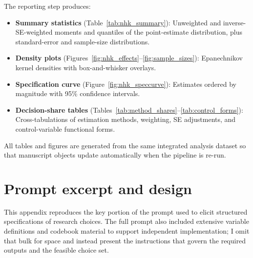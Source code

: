 \documentclass[12pt]{article}
\begin{document}
The reporting step produces:
\begin{itemize}
\item \textbf{Summary statistics} (Table~\ref{tab:nhk_summary}): Unweighted and inverse-SE-weighted moments and quantiles of the point-estimate distribution, plus standard-error and sample-size distributions.
\item \textbf{Density plots} (Figures~\ref{fig:nhk_effects}--\ref{fig:sample_sizes}): Epanechnikov kernel densities with box-and-whisker overlays.
\item \textbf{Specification curve} (Figure~\ref{fig:nhk_speccurve}): Estimates ordered by magnitude with 95\% confidence intervals.
\item \textbf{Decision-share tables} (Tables~\ref{tab:method_shares}--\ref{tab:control_forms}): Cross-tabulations of estimation methods, weighting, SE adjustments, and control-variable functional forms.
\end{itemize}
All tables and figures are generated from the same integrated analysis dataset so that manuscript objects update automatically when the pipeline is re-run.

\section{Prompt excerpt and design}
\label{app:prompt}

This appendix reproduces the key portion of the prompt used to elicit structured specifications of research choices. The full prompt also included extensive variable definitions and codebook material to support independent implementation; I omit that bulk for space and instead present the instructions that govern the required outputs and the feasible choice set.
\end{document}
